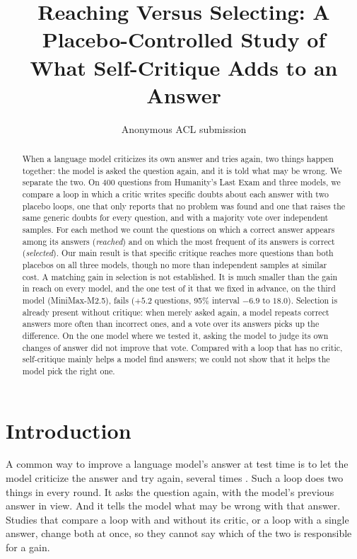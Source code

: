 \documentclass[11pt]{article}
\title{Reaching Versus Selecting: A Placebo-Controlled Study of\\What Self-Critique Adds to an Answer}
\author{Anonymous ACL submission}
\begin{document}
\maketitle

\begin{abstract}
When a language model criticizes its own answer and tries again, two things happen together: the model is asked the question again, and it is told what may be wrong.
We separate the two.
On 400 questions from Humanity's Last Exam and three models, we compare a loop in which a critic writes specific doubts about each answer with two placebo loops, one that only reports that no problem was found and one that raises the same generic doubts for every question, and with a majority vote over independent samples.
For each method we count the questions on which a correct answer appears among its answers (\emph{reached}) and on which the most frequent of its answers is correct (\emph{selected}).
Our main result is that specific critique reaches more questions than both placebos on all three models, though no more than independent samples at similar cost.
A matching gain in selection is not established.
It is much smaller than the gain in reach on every model, and the one test of it that we fixed in advance, on the third model (MiniMax-M2.5), fails ($+5.2$ questions, 95\% interval $-6.9$ to $18.0$).
Selection is already present without critique: when merely asked again, a model repeats correct answers more often than incorrect ones, and a vote over its answers picks up the difference.
On the one model where we tested it, asking the model to judge its own changes of answer did not improve that vote.
Compared with a loop that has no critic, self-critique mainly helps a model find answers; we could not show that it helps the model pick the right one.
\end{abstract}

\section{Introduction}

A common way to improve a language model's answer at test time is to let the model criticize the answer and try again, several times \citep{madaan2023selfrefine,shinn2023reflexion}.
Such a loop does two things in every round.
It asks the question again, with the model's previous answer in view.
And it tells the model what may be wrong with that answer.
Studies that compare a loop with and without its critic, or a loop with a single answer, change both at once, so they cannot say which of the two is responsible for a gain.
\end{document}
